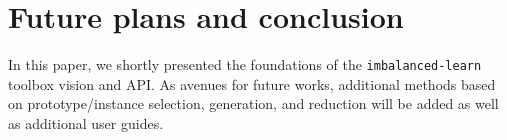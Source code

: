 \documentclass[twoside,11pt]{article}
\begin{document}
\section{Future plans and conclusion}

In this paper, we shortly presented the foundations of the \texttt{imbalanced-learn} toolbox vision and API.
As avenues for future works, additional methods based on prototype/instance selection, generation, and reduction will be added as well as additional user guides.



\end{document}
